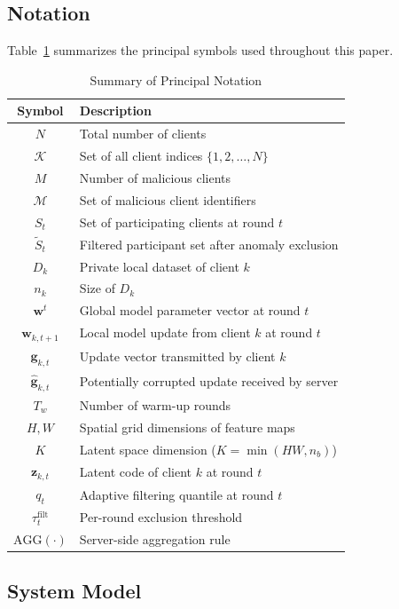 \documentclass[journal]{IEEEtran}
\begin{document}
\subsection{Notation}

Table~\ref{tab:notation} summarizes the principal symbols used throughout this paper.

\begin{table}[t]
\centering
\caption{Summary of Principal Notation}
\label{tab:notation}
\begin{tabular}{@{}cl@{}}
\toprule
\textbf{Symbol} & \textbf{Description} \\
\midrule
$N$ & Total number of clients \\
$\mathcal{K}$ & Set of all client indices $\{1, 2, \ldots, N\}$ \\
$M$ & Number of malicious clients \\
$\mathcal{M}$ & Set of malicious client identifiers \\
$S_t$ & Set of participating clients at round $t$ \\
$\tilde{S}_t$ & Filtered participant set after anomaly exclusion \\
$D_k$ & Private local dataset of client $k$ \\
$n_k$ & Size of $D_k$ \\
$\mathbf{w}^t$ & Global model parameter vector at round $t$ \\
$\mathbf{w}_{k,t+1}$ & Local model update from client $k$ at round $t$ \\
$\mathbf{g}_{k,t}$ & Update vector transmitted by client $k$ \\
$\hat{\mathbf{g}}_{k,t}$ & Potentially corrupted update received by server \\
$T_w$ & Number of warm-up rounds \\
$H, W$ & Spatial grid dimensions of feature maps \\
$K$ & Latent space dimension ($K = \min(HW, n_b)$) \\
$\mathbf{z}_{k,t}$ & Latent code of client $k$ at round $t$ \\
$q_t$ & Adaptive filtering quantile at round $t$ \\
$\tau_t^{\text{filt}}$ & Per-round exclusion threshold \\
$\text{AGG}(\cdot)$ & Server-side aggregation rule \\
\bottomrule
\end{tabular}
\end{table}

\subsection{System Model}
\end{document}
